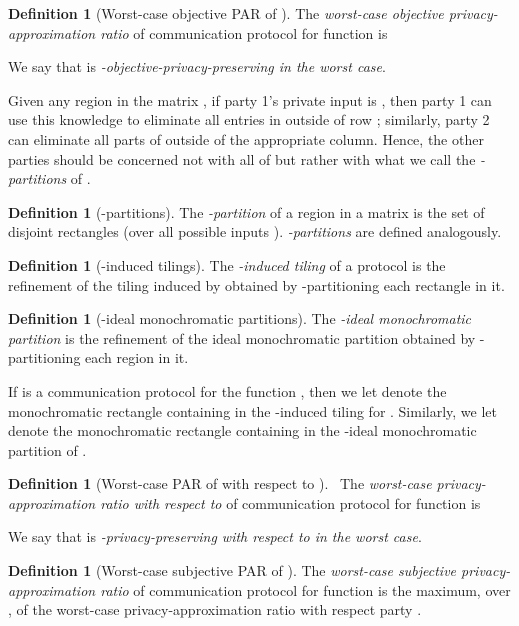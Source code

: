 \documentclass{article}
\theoremstyle{theorem}
\theoremstyle{definition}
\newtheorem{definition}[theorem]{Definition}
\theoremstyle{remark}
\begin{document}
\begin{definition}[Worst-case objective PAR of ]
The \emph{worst-case objective privacy-ap\-prox\-i\-ma\-tion ratio} of
communication protocol  for function  is


We say that  is \emph{-objective-privacy-preserving in
the worst case}.
\end{definition}

Given any region  in the matrix , if party
1's private input is , then party 1 can use this
knowledge to eliminate all entries in  outside of row ; similarly,
party 2 can eliminate all parts of  outside of the appropriate column.
Hence, the other parties should be concerned not with all of  but rather
with what we call the \emph{-partitions} of .

\begin{definition} [-partitions]
The \emph{-partition} of a region  in a matrix  is the set of
disjoint rectangles  (over all possible inputs ).
\emph{-partitions} are defined analogously.
\end{definition}

\begin{definition} [-induced tilings]
The \emph{-induced tiling} of a protocol  is the refinement of the
tiling induced by  obtained by -partitioning each rectangle in
it.
\end{definition}

\begin{definition} [-ideal monochromatic partitions]
The \emph{-ideal monochromatic partition} is the refinement of the ideal
monochromatic partition obtained by -partitioning each region in
it.\end{definition}

If  is a communication protocol for the function , then we let
 denote the monochromatic rectangle containing
 in the -induced tiling for . Similarly, we let
 denote the monochromatic rectangle containing
 in the -ideal monochromatic partition of
.

\begin{definition}[Worst-case PAR of  with respect to ]
\ The \emph{worst-case privacy-ap\-prox\-i\-ma\-tion ratio with respect to
} of communication protocol  for function  is


We say that  is \emph{-privacy-preserving with respect to
 in the worst case}.
\end{definition}


\begin{definition}[Worst-case subjective PAR of ]
The \emph{worst-case subjective privacy-ap\-prox\-i\-ma\-tion ratio} of
communication protocol  for function  is the maximum, over , of the
worst-case privacy-approximation ratio with respect party .
\end{definition}
\end{document}
